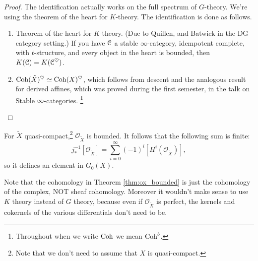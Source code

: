 \begin{proof}
The identification actually works on the full spectrum of $G$-theory. We're using the theorem of 
the heart for $K$-theory. The identification is done as follows.
\begin{enumerate}
\item Theorem of the heart for $K$-theory. (Due to Quillen, and Batwick in the DG category setting.) If you have $\mathcal C$ a stable
$\infty$-category, idempotent complete, with $t$-structure, and every object in the heart is bounded, then $K(\mathcal C) = K(\mathcal C^{\heartsuit})$.
\item $\mathrm{Coh}(\tilde X)^{\heartsuit} \simeq \mathrm{Coh}(X)^{\heartsuit}$, which follows from descent and the analogous result for
derived affines, which was proved during the first semester, in the talk on Stable $\infty$-categories.
\footnote{Throughout when we write $\mathrm{Coh}$ we mean $\mathrm{Coh}^b$.}
\end{enumerate}
\end{proof}

\begin{thm}
\label{thm:ox_bounded}
For $\tilde X$ quasi-compact,\footnote{Note that we don't need to assume that $X$ is quasi-compact.}
$\mathcal{O}_{\tilde X}$ is bounded. It follows that the following sum is finite:
\[	j_*^{-1}[\mathcal{O}_{\tilde X}] = \sum_{i=0}^{\infty} (-1)^i [H^i(\mathcal{O}_{\tilde X})],	\]
so it defines an element in $G_0(X)$.
\end{thm}

\begin{rem}
Note that the cohomology in Theorem \ref{thm:ox_bounded} is just the cohomology of the complex, NOT sheaf cohomology. 
Moreover it wouldn't make sense to
use $K$ theory instead of $G$ theory, because even if $\mathcal{O}_{\tilde X}$ is perfect, the kernels and cokernels 
of the various differentials don't need to be.
\end{rem}

